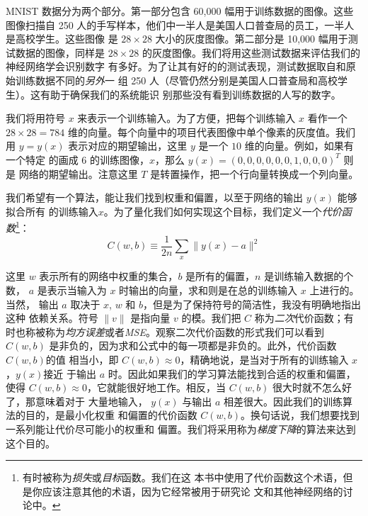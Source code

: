 MNIST 数据分为两个部分。第一部分包含 60,000 幅用于训练数据的图像。这些图像扫描自
250 人的手写样本，他们中一半人是美国人口普查局的员工，一半人是高校学生。这些图像
是 $28 \times 28$ 大小的灰度图像。第二部分是 10,000 幅用于测试数据的图像，同样是
$28 \times 28$ 的灰度图像。我们将用这些测试数据来评估我们的神经网络学会识别数字
有多好。为了让其有好的的测试表现，测试数据取自和原始训练数据不同的\emph{另外}一
组 250 人（尽管仍然分别是美国人口普查局和高校学生）。这有助于确保我们的系统能识
别那些没有看到训练数据的人写的数字。

我们将用符号 $x$ 来表示一个训练输入。为了方便，把每个训练输入 $x$ 看作一个 $28
\times 28 = 784$ 维的向量。每个向量中的项目代表图像中单个像素的灰度值。我们用 $y
= y(x)$ 表示对应的期望输出，这里 $y$ 是一个 $10$ 维的向量。例如，如果有一个特定
的画成 $6$ 的训练图像，$x$，那么 $y(x) = (0, 0, 0, 0, 0, 0, 1, 0, 0, 0)^T$ 则是
网络的期望输出。注意这里 $T$ 是转置操作，把一个行向量转换成一个列向量。

我们希望有一个算法，能让我们找到权重和偏置，以至于网络的输出 $y(x)$ 能够拟合所有
的训练输入$x$。为了量化我们如何实现这个目标，我们定义一个\emph{代价函
  数}\footnote{有时被称为\emph{损失}或\emph{目标}函数。我们在这
  本书中使用了代价函数这个术语，但是你应该注意其他的术语，因为它经常被用于研究论
  文和其他神经网络的讨论中。}：
\begin{equation}
  C(w,b) \equiv \frac{1}{2n} \sum_x \| y(x) - a\|^2
  \label{eq:6}\tag{6}
\end{equation}

这里 $w$ 表示所有的网络中权重的集合，$b$ 是所有的偏置，$n$ 是训练输入数据的个数，
$a$ 是表示当输入为 $x$ 时输出的向量，求和则是在总的训练输入 $x$ 上进行的。当然，
输出 $a$ 取决于 $x$, $w$ 和 $b$，但是为了保持符号的简洁性，我没有明确地指出这种
依赖关系。符号 $\|v\|$ 是指向量 $v$ 的模。我们把 $C$ 称为\emph{二次}代价函数；有
时也称被称为\emph{均方误差}或者\emph{MSE}。观察二次代价函数的形式我们可以看到
$C(w,b)$ 是非负的，因为求和公式中的每一项都是非负的。此外，代价函数 $C(w,b)$的值
相当小，即 $C(w,b) \approx 0$，精确地说，是当对于所有的训练输入 $x$，$y(x)$接近
于输出 $a$ 时。因此如果我们的学习算法能找到合适的权重和偏置，使得 $C(w,b)
\approx 0$，它就能很好地工作。相反，当 $C(w,b)$ 很大时就不怎么好了，那意味着对于
大量地输入， $y(x)$ 与输出 $a$ 相差很大。因此我们的训练算法的目的，是最小化权重
和偏置的代价函数 $C(w,b)$。换句话说，我们想要找到一系列能让代价尽可能小的权重和
偏置。我们将采用称为\emph{梯度下降}的算法来达到这个目的。

